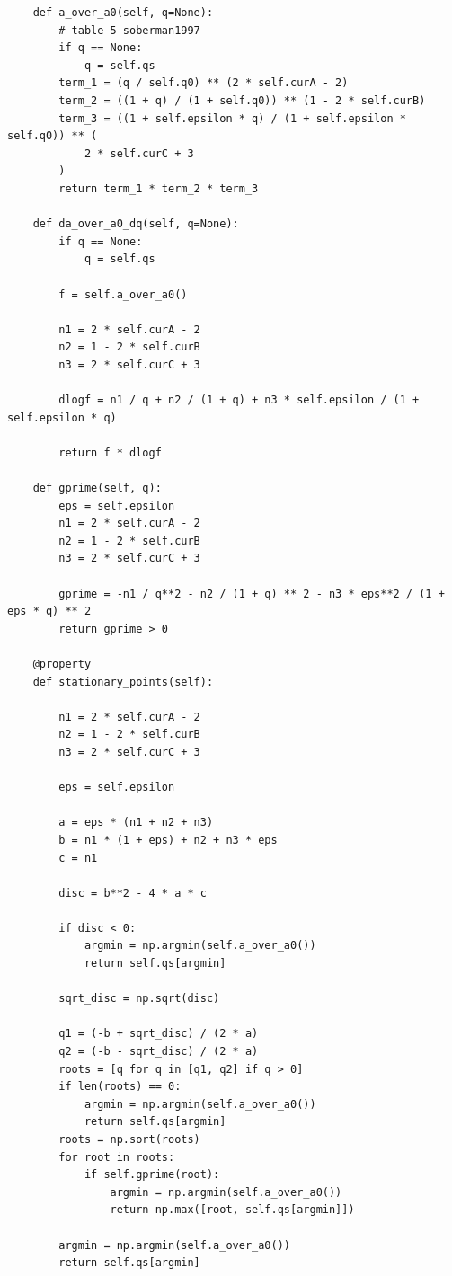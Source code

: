 \documentclass[a4paper,10pt]{article}
\begin{document}
\begin{verbatim}
    def a_over_a0(self, q=None):
        # table 5 soberman1997
        if q == None:
            q = self.qs
        term_1 = (q / self.q0) ** (2 * self.curA - 2)
        term_2 = ((1 + q) / (1 + self.q0)) ** (1 - 2 * self.curB)
        term_3 = ((1 + self.epsilon * q) / (1 + self.epsilon * self.q0)) ** (
            2 * self.curC + 3
        )
        return term_1 * term_2 * term_3

    def da_over_a0_dq(self, q=None):
        if q == None:
            q = self.qs

        f = self.a_over_a0()

        n1 = 2 * self.curA - 2
        n2 = 1 - 2 * self.curB
        n3 = 2 * self.curC + 3

        dlogf = n1 / q + n2 / (1 + q) + n3 * self.epsilon / (1 + self.epsilon * q)

        return f * dlogf

    def gprime(self, q):
        eps = self.epsilon
        n1 = 2 * self.curA - 2
        n2 = 1 - 2 * self.curB
        n3 = 2 * self.curC + 3

        gprime = -n1 / q**2 - n2 / (1 + q) ** 2 - n3 * eps**2 / (1 + eps * q) ** 2
        return gprime > 0

    @property
    def stationary_points(self):

        n1 = 2 * self.curA - 2
        n2 = 1 - 2 * self.curB
        n3 = 2 * self.curC + 3

        eps = self.epsilon

        a = eps * (n1 + n2 + n3)
        b = n1 * (1 + eps) + n2 + n3 * eps
        c = n1

        disc = b**2 - 4 * a * c

        if disc < 0:
            argmin = np.argmin(self.a_over_a0())
            return self.qs[argmin]

        sqrt_disc = np.sqrt(disc)

        q1 = (-b + sqrt_disc) / (2 * a)
        q2 = (-b - sqrt_disc) / (2 * a)
        roots = [q for q in [q1, q2] if q > 0]
        if len(roots) == 0:
            argmin = np.argmin(self.a_over_a0())
            return self.qs[argmin]
        roots = np.sort(roots)
        for root in roots:
            if self.gprime(root):
                argmin = np.argmin(self.a_over_a0())
                return np.max([root, self.qs[argmin]])

        argmin = np.argmin(self.a_over_a0())
        return self.qs[argmin]

\end{verbatim}
\end{document}
